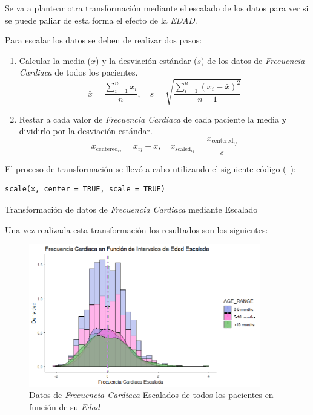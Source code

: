 Se va a plantear otra transformación mediante el escalado de los datos para ver si se puede paliar de esta forma el efecto de la \textit{EDAD}. 

Para escalar los datos se deben de realizar dos pasos:

\begin{enumerate}
    \item Calcular la media (\(\bar{x}\)) y la desviación estándar (\(s\)) de los datos de \textit{Frecuencia Cardiaca} de todos los pacientes.
    \[
        \bar{x} = \frac{\sum_{i=1}^{n} x_i}{n}, \quad s = \sqrt{\frac{\sum_{i=1}^{n} (x_i - \bar{x})^2}{n-1}}
    \]

    \item Restar a cada valor de \textit{Frecuencia Cardiaca} de cada paciente la media y dividirlo por la desviación estándar.
    \[
        x_{\text{centered}_{ij}} = x_{ij} - \bar{x}, \quad x_{\text{scaled}_{ij}} = \frac{x_{\text{centered}_{ij}}}{s}
    \]
\end{enumerate}

El proceso de transformación se llevó a cabo utilizando el siguiente código (~\cite{BeckerChambersWilks1988}):

\begin{code}[H]
    \begin{lstlisting}
scale(x, center = TRUE, scale = TRUE)
    \end{lstlisting}
    \caption{Transformación de datos de \textit{Frecuencia Cardiaca} mediante Escalado}\label{cod:transformacion-fc-escalado}
 \end{code}


Una vez realizada esta transformación los resultados son los siguientes: 


\begin{figure}[H]
    \centering
    \includegraphics[width=0.9\textwidth]{img/frecuencia-cardiaca-edad-escalada.png}
    \caption{Datos de \textit{Frecuencia Cardiaca} Escalados de todos los pacientes en función de su \textit{Edad}}
    \label{fig:frecuencia-cardiaca-edad-escala}
\end{figure}

